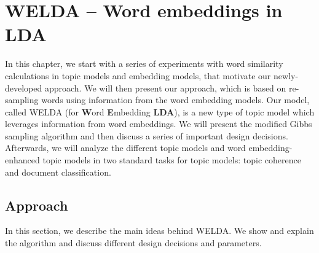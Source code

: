 \documentclass[
        a4paper,
        titlepage,
        twoside,
        parskip,
        numbers=noenddot
        ]{scrbook}
\theoremstyle{break}
\begin{document}


\chapter{WELDA -- Word embeddings in LDA}
\label{sec:welda}

In this chapter, we start with a series of experiments with word similarity calculations in topic models and embedding models, that motivate our newly-developed approach.
We will then present our approach, which is based on re-sampling words using information from the word embedding models.
Our model, called WELDA (for \textbf{W}ord \textbf{E}mbedding \textbf{LDA}), is a new type of topic model which leverages information from word embeddings.
We will present the modified Gibbs sampling algorithm and then discuss a series of important design decisions.
Afterwards, we will analyze the different topic models and word embedding-enhanced topic models in two standard tasks for topic models: topic coherence and document classification.

\section{Approach}
In this section, we describe the main ideas behind WELDA.
We show and explain the algorithm and discuss different design decisions and parameters.
\end{document}
